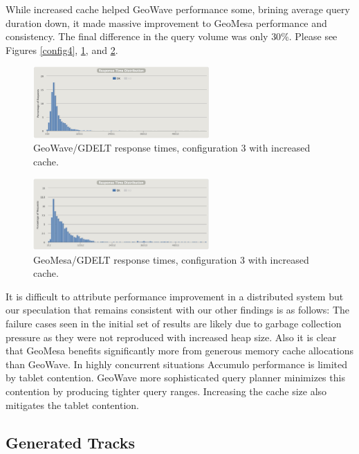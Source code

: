 While increased cache helped GeoWave performance some, brining average query duration down, it made massive improvement to GeoMesa performance and consistency.
The final difference in the query volume was only $30$\%.
Please see Figures \ref{config4}, \ref{config4distrogw}, and \ref{config4distrogm}.

\begin{figure}[h!tb]
  \centering
  \includegraphics[width=0.60\textwidth]{images/mt4-gw.png}
  \caption{GeoWave/GDELT response times, configuration 3 with increased cache.}
  \label{config4distrogw}
\end{figure}

\begin{figure}[h!tb]
  \centering
  \includegraphics[width=0.60\textwidth]{images/gm-4.png}
  \caption{GeoMesa/GDELT response times, configuration 3 with increased cache.}
  \label{config4distrogm}
\end{figure}

It is difficult to attribute performance improvement in a distributed system but our speculation that remains consistent with our other findings is as follows: The failure cases seen in the initial set of results are likely due to garbage collection pressure as they were not reproduced with increased heap size.
Also it is clear that GeoMesa benefits significantly more from generous memory cache allocations than GeoWave.
In highly concurrent situations Accumulo performance is limited by tablet contention.
GeoWave more sophisticated query planner minimizes this contention by producing tighter query ranges.
Increasing the cache size also mitigates the tablet contention.

\subsection{Generated Tracks}

